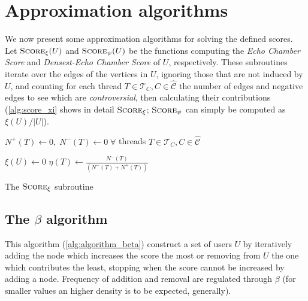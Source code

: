 \section{Approximation algorithms}%
\label{sub:approximation_algorithms}

We now present some approximation algorithms for solving the defined scores.
Let $\textsc{Score}_{\xi} (U)$ and $\textsc{Score}_{\psi} (U)$ be the functions computing the
\emph{Echo Chamber Score} and \emph{Densest-Echo Chamber Score} of $U$,
respectively. These subroutines iterate over the edges of the vertices in $U$,
ignoring those that are not induced by $U$, and counting for each thread $T \in
	\mathcal{T}_{C}, C \in \mathcal{\hat{C}} $ the number of edges and negative edges
to see which are \emph{controversial}, then calculating their contributions
(\autoref{alg:score_xi} shows in detail $\textsc{Score}_\xi$;
$\textsc{Score}_\psi$ can simply be computed as $\xi(U)/|U|$).

\begin{algorithm}
	\SetAlgoLined
	$N^{+} (T) \leftarrow 0, \; N^{-} (T) \leftarrow 0\; \forall $ threads $T
		\in \mathcal{T}_{C}, C \in \mathcal{\hat{C}}   $ \;


	$\xi(U) \leftarrow 0$ \;
	$\eta(T) \leftarrow\frac{N^{-}(T)}{(N^{-}(T) + N^{+} (T))}$ \;

	\caption{The $\textsc{Score}_{\xi}  $ subroutine}
	\label{alg:score_xi}
\end{algorithm}

\subsection{The $\beta$ algorithm}%
\label{ssub:the_beta_approach}

This algorithm (\autoref{alg:algorithm_beta}) construct a set of users $U$ by
iteratively adding the node which increases the score the most or removing from
$U$ the one which contributes the least, stopping when the score cannot be
increased by adding a node. Frequency of addition and removal are regulated
through $\beta $ (for smaller values an higher density is to be expected,
generally).

